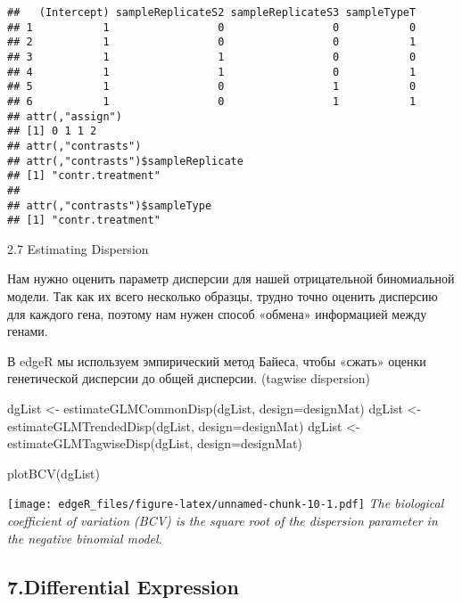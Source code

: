 \documentclass[
]{article}
\newenvironment{Shaded}{\begin{snugshade}}{\end{snugshade}}
\newcommand{\AttributeTok}[1]{\textcolor[rgb]{0.77,0.63,0.00}{#1}}
\newcommand{\FunctionTok}[1]{\textcolor[rgb]{0.00,0.00,0.00}{#1}}
\newcommand{\NormalTok}[1]{#1}
\newcommand{\OtherTok}[1]{\textcolor[rgb]{0.56,0.35,0.01}{#1}}
\begin{document}
\begin{verbatim}
##   (Intercept) sampleReplicateS2 sampleReplicateS3 sampleTypeT
## 1           1                 0                 0           0
## 2           1                 0                 0           1
## 3           1                 1                 0           0
## 4           1                 1                 0           1
## 5           1                 0                 1           0
## 6           1                 0                 1           1
## attr(,"assign")
## [1] 0 1 1 2
## attr(,"contrasts")
## attr(,"contrasts")$sampleReplicate
## [1] "contr.treatment"
## 
## attr(,"contrasts")$sampleType
## [1] "contr.treatment"
\end{verbatim}

2.7 Estimating Dispersion

Нам нужно оценить параметр дисперсии для нашей отрицательной
биномиальной модели. Так как их всего несколько образцы, трудно точно
оценить дисперсию для каждого гена, поэтому нам нужен способ «обмена»
информацией между генами.

В edgeR мы используем эмпирический метод Байеса, чтобы «сжать» оценки
генетической дисперсии до общей дисперсии. (tagwise dispersion)

\begin{Shaded}
\begin{Highlighting}[]
\NormalTok{dgList }\OtherTok{\textless{}{-}} \FunctionTok{estimateGLMCommonDisp}\NormalTok{(dgList, }\AttributeTok{design=}\NormalTok{designMat)}
\NormalTok{dgList }\OtherTok{\textless{}{-}} \FunctionTok{estimateGLMTrendedDisp}\NormalTok{(dgList, }\AttributeTok{design=}\NormalTok{designMat)}
\NormalTok{dgList }\OtherTok{\textless{}{-}} \FunctionTok{estimateGLMTagwiseDisp}\NormalTok{(dgList, }\AttributeTok{design=}\NormalTok{designMat)}
\end{Highlighting}
\end{Shaded}

\begin{Shaded}
\begin{Highlighting}[]
\FunctionTok{plotBCV}\NormalTok{(dgList)}
\end{Highlighting}
\end{Shaded}

\texttt{[image: edgeR\_files/figure-latex/unnamed-chunk-10-1.pdf]}
\emph{The biological coefficient of variation (BCV) is the square root
of the dispersion parameter in the negative binomial model.}

\hypertarget{differential-expression}{%
\subsection{7.Differential Expression}\label{differential-expression}}
\end{document}
